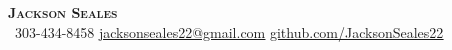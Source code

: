 \begin{center}
    \textbf{\Huge \scshape Jackson Seales} \\ \vspace{1pt}
     \ \small 303-434-8458 \quad
    \href{mailto:firstlast@gmail.com}{ \underline{jacksonseales22@gmail.com}} \quad
    \href{https://github.com/}{ \underline{github.com/JacksonSeales22}}
\end{center}